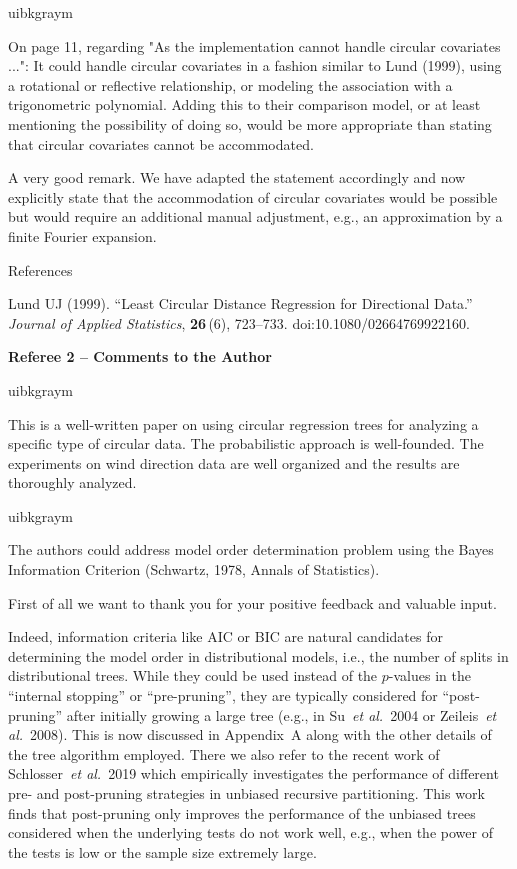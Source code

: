 \documentclass[english, noconfig]{uibklttr}
\newcommand{\section}[1]{{\Large{\textbf{#1}}}}
\newenvironment{re}{
    \begin{color}{uibkgraym}
        \itshape
}{
    \end{color}
}
\begin{document}
\vspace{0.5em}
\begin{re}
On page 11, regarding "As the implementation cannot handle circular
covariates ...": It could handle circular covariates in a fashion similar to
Lund (1999), using a rotational or reflective relationship, or modeling the
association with a trigonometric polynomial. Adding this to their comparison
model, or at least mentioning the possibility of doing so, would be more
appropriate than stating that circular covariates cannot be accommodated.
\end{re}

A very good remark. We have adapted the statement accordingly and now
explicitly state that the accommodation of circular covariates would be
possible but would require an additional manual adjustment, e.g., an approximation by
a finite Fourier expansion.

\vspace{0.5cm}
References

Lund UJ (1999). ``Least Circular Distance Regression for Directional Data.''
\emph{Journal of Applied Statistics}, \textbf{26}\,(6), 723--733.
doi:10.1080/02664769922160.

\newpage

\section{Referee 2 -- Comments to the Author}

\begin{re}
This is a well-written paper on using circular regression trees for analyzing a
specific type of circular data. The probabilistic approach is well-founded. The
experiments on wind direction data are well organized and the results are
thoroughly analyzed.
\end{re}

\begin{re}
The authors could address model order determination problem using the
Bayes Information Criterion (Schwartz, 1978, Annals of Statistics).  
\end{re}

First of all we want to thank you for your positive feedback and valuable input. 

Indeed, information criteria like AIC or BIC are natural candidates for
determining the model order in distributional models, i.e., the number of splits
in distributional trees. While they could be used instead of the $p$-values in
the ``internal stopping'' or ``pre-pruning'', they are typically considered
for ``post-pruning'' after initially growing a large tree (e.g., in
Su~\emph{et al.}~2004 or Zeileis~\emph{et al.}~2008). This is now discussed
in Appendix~A along with the other details of the tree algorithm employed.
There we also refer to the recent work of Schlosser~\emph{et al.}~2019
which empirically investigates the performance of different pre- and post-pruning
strategies in unbiased recursive partitioning. This work finds that post-pruning
only improves the performance of the unbiased trees considered when the
underlying tests do not work well, e.g., when the power of the tests is low
or the sample size extremely large.
\end{document}
